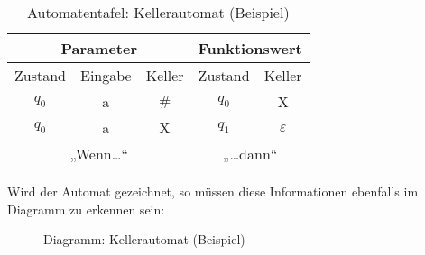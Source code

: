 \begin{table}[h]
\centering
\begin{tabular}{|c|c|c||c|c|}
\hline
\multicolumn{3}{|c||}{Parameter} & \multicolumn{2}{c|}{Funktionswert} \\ \hline
Zustand   & Eingabe   & Keller  & Zustand          & Keller          \\ \hline
$q_0$       & a         & $\#$       & $q_0$              & X               \\ \hline
$q_0$       & a         & X       & $q_1$              & $\varepsilon$               \\ \hline
\multicolumn{3}{|c||}{„Wenn…“} & \multicolumn{2}{c|}{„…dann“} \\ \hline
\end{tabular}
\caption{Automatentafel: Kellerautomat (Beispiel)}
\label{tbl:bspkeller}
\end{table}

Wird der Automat gezeichnet, so müssen diese Informationen ebenfalls im Diagramm zu erkennen sein:

\begin{figure}[H]
\centering
{}
\caption{Diagramm: Kellerautomat (Beispiel)}
\label{fig:bspkeller}
\end{figure}